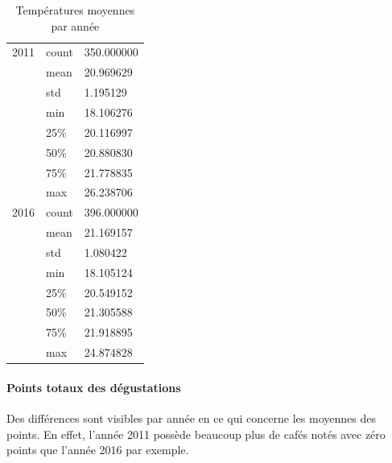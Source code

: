 \begin{table}[H]
	\centering
	\caption{Températures moyennes par année}
	\label{YearlyTmean}
	\begin{tabular}{lll}
		2011 & count                              & 350.000000 \\
		&mean & 20.969629                                      \\
		&std  & 1.195129                                       \\
		&min  & 18.106276                                      \\
		&25\% & 20.116997                                      \\
		&50\% & 20.880830                                      \\
		&75\% & 21.778835                                      \\
		&max  & 26.238706                                      \\
		2016 & count                              & 396.000000 \\
		&mean & 21.169157                                      \\
		&std  & 1.080422                                       \\
		&min  & 18.105124                                      \\
		&25\% & 20.549152                                      \\
		&50\% & 21.305588                                      \\
		&75\% & 21.918895                                      \\
		&max  & 24.874828  
	\end{tabular}
\end{table}

\newpage
\paragraph{Points totaux des dégustations} Des différences sont visibles par année en ce qui concerne les moyennes des points. En effet, l'année 2011 possède beaucoup plus de cafés notés avec zéro points que l'année 2016 par exemple.

